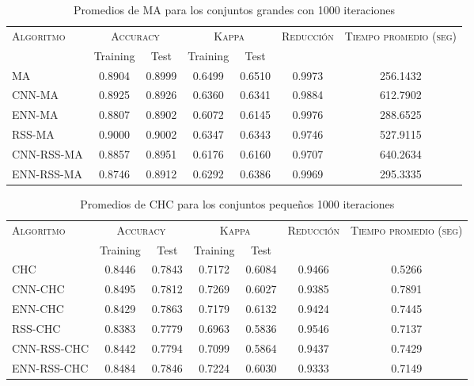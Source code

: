 \begin{table}[]
\centering
\begin{tabular}{l c c c c c c}
\hline
\multirow{2}{*}{\textsc{Algoritmo}}
	& \multicolumn{2}{c}{\textsc{Accuracy}}
	& \multicolumn{2}{c}{\textsc{Kappa}}
	& \textsc{Reducción}
	& \textsc{Tiempo promedio (seg)} \\
	& Training & Test
	& Training & Test \\ 
\hline
\hline

MA   & 0.8904 & 0.8999 & 0.6499 & 0.6510 & 0.9973 & 256.1432 \\
CNN-MA & 0.8925 & 0.8926 & 0.6360 & 0.6341 & 0.9884 & 612.7902 \\
ENN-MA & 0.8807 & 0.8902 & 0.6072 & 0.6145 & 0.9976 & 288.6525 \\
RSS-MA & 0.9000 & 0.9002 & 0.6347 & 0.6343 & 0.9746 & 527.9115 \\
CNN-RSS-MA & 0.8857 & 0.8951 & 0.6176 & 0.6160 & 0.9707 & 640.2634 \\
ENN-RSS-MA & 0.8746 & 0.8912 & 0.6292 & 0.6386 & 0.9969 & 295.3335 \\

\hline
\end{tabular}
\caption{Promedios de MA para los conjuntos grandes con 1000 iteraciones}
\label{grande-ma}
\end{table}


\begin{table}[]
\centering
\begin{tabular}{l c c c c c c}
\hline
\multirow{2}{*}{\textsc{Algoritmo}}
	& \multicolumn{2}{c}{\textsc{Accuracy}}
	& \multicolumn{2}{c}{\textsc{Kappa}}
	& \textsc{Reducción}
	& \textsc{Tiempo promedio (seg)} \\
	& Training & Test
	& Training & Test \\ 
\hline
\hline

CHC & 0.8446 & 0.7843 & 0.7172 & 0.6084 & 0.9466 & 0.5266 \\
CNN-CHC & 0.8495 & 0.7812 & 0.7269 & 0.6027 & 0.9385 & 0.7891 \\
ENN-CHC & 0.8429 & 0.7863 & 0.7179 & 0.6132 & 0.9424 & 0.7445 \\
RSS-CHC & 0.8383 & 0.7779 & 0.6963 & 0.5836 & 0.9546 & 0.7137 \\
CNN-RSS-CHC  & 0.8442 & 0.7794 & 0.7099 & 0.5864 & 0.9437 & 0.7429 \\
ENN-RSS-CHC & 0.8484 & 0.7846 & 0.7224 & 0.6030 & 0.9333 & 0.7149 \\

\hline
\end{tabular}
\caption{Promedios de CHC para los conjuntos pequeños 1000 iteraciones}
\label{peq-chc}
\end{table}


